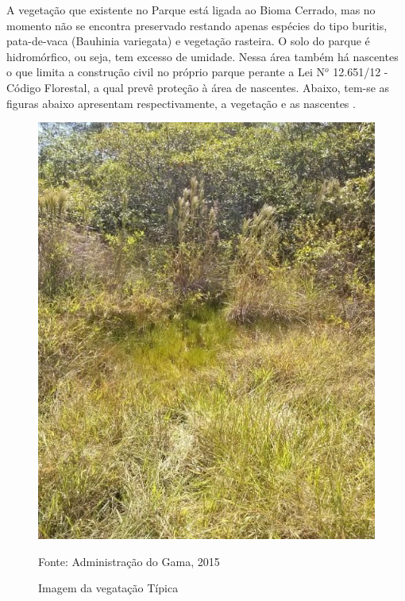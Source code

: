 A vegeta\c{c}\~ao que existente no Parque est\'a ligada ao Bioma Cerrado, mas no momento n\~ao se encontra preservado restando apenas esp\'ecies do tipo buritis, pata-de-vaca (Bauhinia variegata) e vegeta\c{c}\~ao rasteira.  O solo do parque \'e hidrom\'orfico, ou seja, tem excesso de umidade. Nessa \'area tamb\'em h\'a nascentes o que limita a constru\c{c}\~ao civil no pr\'oprio parque perante a Lei N$^{o}$ 12.651/12 - C\'odigo Florestal, a qual prev\^e prote\c{c}\~ao \`a \'area de nascentes. Abaixo, tem-se as figuras abaixo apresentam respectivamente, a vegeta\c{c}\~ao e as nascentes \cite{COEX}.

\begin{figure}[h]
	\centering
	\label{Imagem do Parque Vivencial do Gama}
		\includegraphics[keepaspectratio=true,scale=0.4]{figuras/VegatacaoTipica.jpg}
	\caption{Imagem da vegata\c{c}\~ao T\'ipica}
	\small{Fonte: Administra\c{c}\~ao do Gama, 2015}
\end{figure}

